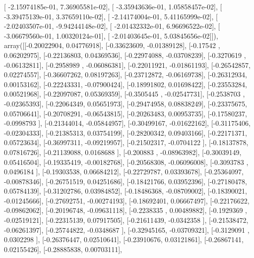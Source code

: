 \documentclass{article}
\begin{document}
       [ -2.15974185e-01,   7.36905581e-02],
       [ -3.35943636e-01,   1.05858457e-02],
       [ -3.39475139e-01,   3.37659110e-02],
       [ -2.14174004e-01,   5.41165999e-02],
       [ -2.02403507e-01,  -9.94244148e-02],
       [ -2.01432332e-01,   6.96696522e-02],
       [ -3.06679560e-01,   1.00320124e-01],
       [ -2.01403645e-01,   5.03845656e-02]]), array([[-0.20022904,  0.04776918],
       [-0.33623609, -0.01389128],
       [-0.17542   ,  0.06202975],
       [-0.22136803,  0.04369536],
       [-0.22974088, -0.03708239],
       [-0.3270619 , -0.06132811],
       [-0.2958989 , -0.06086381],
       [-0.22011921, -0.01861193],
       [-0.26542857,  0.02274557],
       [-0.36607262,  0.08197263],
       [-0.23712872, -0.06169738],
       [-0.26312934,  0.00153162],
       [-0.22243331, -0.07900424],
       [-0.18991802,  0.01698422],
       [-0.23553284,  0.00521968],
       [-0.22097087,  0.05369359],
       [-0.3505445 , -0.02547731],
       [-0.2538703 , -0.02365393],
       [-0.22064349,  0.05651973],
       [-0.29474958,  0.08838249],
       [-0.23375675,  0.05706641],
       [-0.20708291, -0.06543815],
       [-0.20263483,  0.00953735],
       [-0.17580237, -0.0998793 ],
       [-0.21344014, -0.05844957],
       [-0.30499167, -0.01622162],
       [-0.31175406, -0.02304333],
       [-0.21385313,  0.03754199],
       [-0.28200342,  0.09403166],
       [-0.22171371,  0.05723634],
       [-0.36997311, -0.09219957],
       [-0.21502317, -0.0704122 ],
       [-0.18137878,  0.07816726],
       [-0.21139088,  0.0168688 ],
       [-0.200883  , -0.08963982],
       [-0.30039149,  0.05416504],
       [-0.19335419, -0.00182768],
       [-0.20568308, -0.06096008],
       [-0.3093783 ,  0.0496184 ],
       [-0.19303538,  0.06684212],
       [-0.22729787,  0.03393678],
       [-0.25364097, -0.00878346],
       [-0.26751519,  0.04251686],
       [-0.18421766,  0.03952396],
       [-0.27180478,  0.05784139],
       [-0.31202786,  0.03984852],
       [-0.18486368, -0.08709002],
       [-0.18390021, -0.01245666],
       [-0.27692751, -0.00274193],
       [-0.18692401,  0.06667497],
       [-0.22176622, -0.09862062],
       [-0.20196748, -0.09631118],
       [-0.2238335 ,  0.00489882],
       [-0.1929369 , -0.02519121],
       [-0.22315139,  0.07917505],
       [-0.21611439, -0.0342358 ],
       [-0.21538472, -0.06261397],
       [-0.25744822, -0.0348687 ],
       [-0.32945165, -0.03709321],
       [-0.3129091 ,  0.0302298 ],
       [-0.26376447,  0.02510641],
       [-0.23910676,  0.03121861],
       [-0.26867141,  0.02155426],
       [-0.28885838,  0.00703111],
\end{document}
